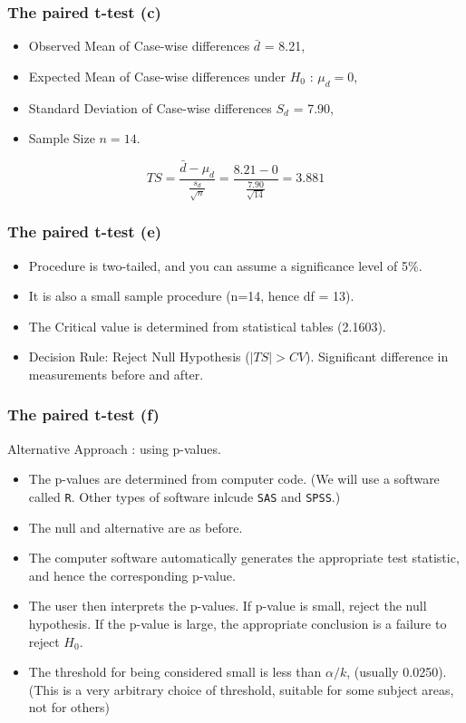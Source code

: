 \documentclass[a4]{beamer}
\begin{document}
\begin{frame}[fragile]
\frametitle{The paired t-test (c)}
\begin{itemize}
\item Observed Mean of Case-wise differences $\bar{d}$ = 8.21,
\item Expected Mean of Case-wise differences under $H_0$ : $\mu_d = 0$,
\item Standard Deviation of Case-wise differences $S_d$ = 7.90,
\item Sample Size $n=14$.
\end{itemize}

\[ TS = \frac{\bar{d} - \mu_d}{\frac{s_d}{\sqrt{n}}} = \frac{8.21 - 0}{\frac{7.90}{\sqrt{14}}} = 3.881 \]
\end{frame}
\begin{frame}[fragile]
\frametitle{The paired t-test (e)}

\begin{itemize}
\item Procedure is two-tailed, and you can assume a significance level of 5\%.
\item It is also a small sample procedure (n=14, hence df = 13).
\item The Critical value is determined from statistical tables (2.1603).
\item Decision Rule: Reject Null Hypothesis ($|TS|>CV$). Significant difference in measurements before and after.
\end{itemize}

\end{frame}
\begin{frame}[fragile]
\frametitle{The paired t-test (f)}
Alternative Approach : using p-values.
\begin{itemize}
\item The p-values are determined from computer code. (We will use a software called \texttt{R}. Other types of software inlcude \texttt{SAS} and \texttt{SPSS}.)
\item The null and alternative are as before.
\item The computer software automatically generates the appropriate test statistic, and hence the corresponding p-value.
\item The user then interprets the p-values. If p-value is small, reject the null hypothesis. If the p-value is large, the appropriate conclusion is a failure to reject $H_0$.
\item The threshold for being considered small is less than $\alpha/k$, (usually 0.0250). (This is a very arbitrary choice of threshold, suitable for some subject areas, not for others)
\end{itemize}
\end{frame}
\end{document}
